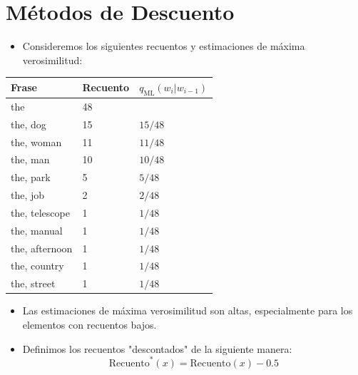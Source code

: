 \section{Métodos de Descuento}
\begin{itemize}
    \item Consideremos los siguientes recuentos y estimaciones de máxima verosimilitud:
\end{itemize}

\begin{table}[h]
    \centering
    \begin{tabular}{lll}
        \textbf{Frase} & \textbf{Recuento} & \textbf{$q_{\text{ML}}(w_i | w_{i-1})$} \\
        \hline
        the & 48 & \\
        the, dog & 15 & $15/48$ \\
        the, woman & 11 & $11/48$ \\
        the, man & 10 & $10/48$ \\
        the, park & 5 & $5/48$ \\
        the, job & 2 & $2/48$ \\
        the, telescope & 1 & $1/48$ \\
        the, manual & 1 & $1/48$ \\
        the, afternoon & 1 & $1/48$ \\
        the, country & 1 & $1/48$ \\
        the, street & 1 & $1/48$ \\
    \end{tabular}
\end{table}

\begin{itemize}
    \item Las estimaciones de máxima verosimilitud son altas, especialmente para los elementos con recuentos bajos.
    \item Definimos los recuentos "descontados" de la siguiente manera:
    \[
    \text{Recuento}^*(x) = \text{Recuento}(x) - 0.5
    \]
\end{itemize}


